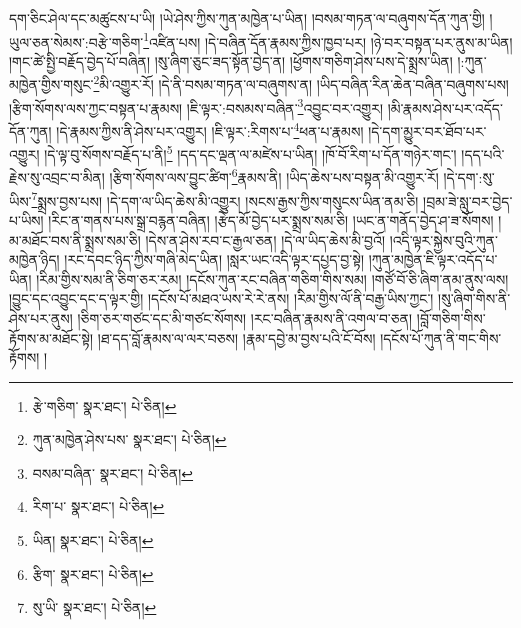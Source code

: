 དག་ཅིང་ཤེལ་དང་མཚུངས་པ་ཡི། །ཡེ་ཤེས་ཀྱིས་ཀུན་མཁྱེན་པ་ཡིན། །བསམ་གཏན་ལ་བཞུགས་དོན་ཀུན་གྱི། །ཡུལ་ཅན་སེམས་:བརྩེ་གཅིག་\footnote{རྩེ་གཅིག་  སྣར་ཐང་།  པེ་ཅིན། }འཛིན་པས། །དེ་བཞིན་དོན་རྣམས་ཀྱིས་ཁྱབ་པར། །ཉེ་བར་བསྟན་པར་ནུས་མ་ཡིན། །གང་ཚེ་སྤྱི་བརྗོད་བྱེད་པོ་བཞིན། །སུ་ཞིག་ཅུང་ཟད་སྟོན་བྱེད་ན། །ཕྱོགས་གཅིག་ཤེས་པས་དེ་སྨྲས་ཡིན། །:ཀུན་མཁྱེན་གྱིས་གསུང་\footnote{ཀུན་མཁྱེན་ཤེས་པས་  སྣར་ཐང་།  པེ་ཅིན། }མི་འགྱུར་རོ། །དེ་ནི་བསམ་གཏན་ལ་བཞུགས་ན། །ཡིད་བཞིན་རིན་ཆེན་བཞིན་བཞུགས་པས། །རྩིག་སོགས་ལས་ཀྱང་བསྟན་པ་རྣམས། །ཇི་ལྟར་:བསམས་བཞིན་\footnote{བསམ་བཞིན་  སྣར་ཐང་།  པེ་ཅིན། }འབྱུང་བར་འགྱུར། །མི་རྣམས་ཤེས་པར་འདོད་དོན་ཀུན། །དེ་རྣམས་ཀྱིས་ནི་ཤེས་པར་འགྱུར། །ཇི་ལྟར་:རིགས་པ་\footnote{རིག་པ་  སྣར་ཐང་།  པེ་ཅིན། }ཕན་པ་རྣམས། །དེ་དག་མྱུར་བར་ཐོབ་པར་འགྱུར། །དེ་ལྟ་བུ་སོགས་བརྗོད་པ་ནི།\footnote{ཡིན།  སྣར་ཐང་།  པེ་ཅིན། } །དད་དང་ལྡན་ལ་མཛེས་པ་ཡིན། །ཁོ་བོ་རིག་པ་དོན་གཉེར་གང་། །དད་པའི་རྗེས་སུ་འབྲང་བ་མིན། །རྩིག་སོགས་ལས་བྱུང་ཚིག་\footnote{རྩིག་  སྣར་ཐང་།  པེ་ཅིན། }རྣམས་ནི། །ཡིད་ཆེས་པས་བསྟན་མི་འགྱུར་རོ། །དེ་དག་:སུ་ཡིས་\footnote{སུ་ཡི་  སྣར་ཐང་།  པེ་ཅིན། }སྨྲས་བྱས་པས། །དེ་དག་ལ་ཡིད་ཆེས་མི་འགྱུར། །སངས་རྒྱས་ཀྱིས་གསུངས་ཡིན་ནམ་ཅི། །བྲམ་ཟེ་སླུ་བར་བྱེད་པ་ཡིས། །རིང་ན་གནས་པས་སྒྲ་བརྙན་བཞིན། །རྩེད་མོ་བྱེད་པར་སྨྲས་སམ་ཅི། །ཡང་ན་གནོད་བྱེད་ཤ་ཟ་སོགས། །མ་མཐོང་བས་ནི་སྨྲས་སམ་ཅི། །དེས་ན་ཤེས་རབ་ང་རྒྱལ་ཅན། །དེ་ལ་ཡིད་ཆེས་མི་བྱའོ། །འདི་ལྟར་སྐྱེས་བུའི་ཀུན་མཁྱེན་ཉིད། །རང་དབང་ཉིད་ཀྱིས་གཞི་མེད་ཡིན། །སླར་ཡང་འདི་ལྟར་དཔྱད་བྱ་སྟེ། །ཀུན་མཁྱེན་ཇི་ལྟར་འདོད་པ་ཡིན། །རིམ་གྱིས་སམ་ནི་ཅིག་ཅར་རམ། །དངོས་ཀུན་རང་བཞིན་གཅིག་གིས་སམ། །གཙོ་བོ་ཅི་ཞིག་ནམ་ནུས་ལས། །བྱུང་དང་འབྱུང་དང་ད་ལྟར་གྱི། །དངོས་པོ་མཐའ་ཡས་རེ་རེ་ནས། །རིམ་གྱིས་ལོ་ནི་བརྒྱ་ཡིས་ཀྱང་། །སུ་ཞིག་གིས་ནི་ཤེས་པར་ནུས། །ཅིག་ཅར་གཙང་དང་མི་གཙང་སོགས། །རང་བཞིན་རྣམས་ནི་འགལ་བ་ཅན། །བློ་གཅིག་གིས་རྟོགས་མ་མཐོང་སྟེ། །ཐ་དད་བློ་རྣམས་ལ་ལར་བཅས། །རྣམ་དབྱེ་མ་བྱས་པའི་ངོ་བོས། །དངོས་པོ་ཀུན་ནི་གང་གིས་རྟོགས། །

